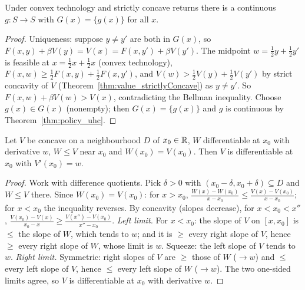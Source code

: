 \begin{theorem}
\label{thm:exists_continuous_policy}
\leanok
{}
Under convex technology and strictly concave returns there is a continuous $g : S \to S$ with
$G(x) = \{g(x)\}$ for all $x$.
\end{theorem}
\begin{proof}
\leanok
Uniqueness: suppose $y \neq y'$ are both in $G(x)$, so $F(x, y) + \beta V(y) = V(x) = F(x, y') + \beta V(y')$.
The midpoint $w = \tfrac12 y + \tfrac12 y'$ is feasible at $x = \tfrac12 x + \tfrac12 x$ (convex
technology), $F(x, w) \ge \tfrac12 F(x, y) + \tfrac12 F(x, y')$, and $V(w) > \tfrac12 V(y) + \tfrac12 V(y')$
by strict concavity of $V$ (Theorem~\ref{thm:value_strictlyConcave}) as $y \neq y'$. So
$F(x, w) + \beta V(w) > V(x)$, contradicting the Bellman inequality. Choose $g(x) \in G(x)$ (nonempty);
then $G(x) = \{g(x)\}$ and $g$ is continuous by Theorem~\ref{thm:policy_uhc}.
\end{proof}

\begin{lemma}
\label{lem:hasDerivAt_concave_minorant}
\leanok
Let $V$ be concave on a neighbourhood $D$ of $x_0 \in \mathbb{R}$, $W$ differentiable at $x_0$ with derivative
$w$, $W \le V$ near $x_0$ and $W(x_0) = V(x_0)$. Then $V$ is differentiable at $x_0$ with $V'(x_0) = w$.
\end{lemma}
\begin{proof}
\leanok
Work with difference quotients. Pick $\delta > 0$ with $(x_0 - \delta, x_0 + \delta) \subseteq D$ and
$W \le V$ there. Since $W(x_0) = V(x_0)$:
for $x > x_0$, $\frac{W(x) - W(x_0)}{x - x_0} \le \frac{V(x) - V(x_0)}{x - x_0}$; for $x < x_0$ the
inequality reverses. By concavity (slopes decrease), for $x < x_0 < x''$,
$\frac{V(x_0) - V(x)}{x_0 - x} \ge \frac{V(x'') - V(x_0)}{x'' - x_0}$.
\emph{Left limit.} For $x < x_0$: the slope of $V$ on $[x, x_0]$ is $\le$ the slope of $W$, which tends
to $w$; and it is $\ge$ every right slope of $V$, hence $\ge$ every right slope of $W$, whose limit is
$w$. Squeeze: the left slope of $V$ tends to $w$.
\emph{Right limit.} Symmetric: right slopes of $V$ are $\ge$ those of $W$ ($\to w$) and $\le$ every left
slope of $V$, hence $\le$ every left slope of $W$ ($\to w$). The two one-sided limits agree, so $V$ is
differentiable at $x_0$ with derivative $w$.
\end{proof}

